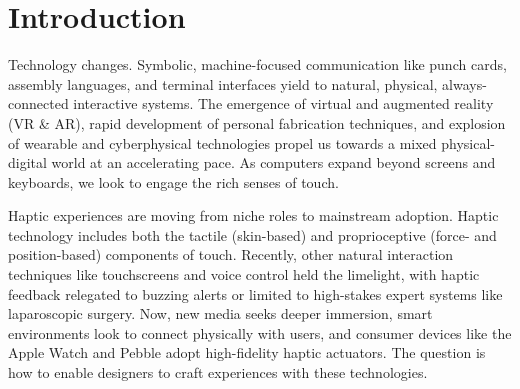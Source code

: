 
\chapter{Introduction}
\label{ch:introduction}
Technology changes.
Symbolic, machine-focused communication like punch cards, assembly languages, and terminal interfaces yield to natural, physical, always-connected interactive systems.
The emergence of virtual and augmented reality (VR \& AR), rapid development of personal fabrication techniques, and explosion of wearable and cyberphysical technologies propel us towards a mixed physical-digital world at an accelerating pace.
As computers expand beyond screens and keyboards, we look to engage the rich senses of touch.




Haptic experiences are moving from niche roles to mainstream adoption.
Haptic technology includes both the tactile (skin-based) and proprioceptive (force- and position-based) components of touch.
Recently, other natural interaction techniques like touchscreens and voice control held the limelight, with haptic feedback relegated to buzzing alerts or limited to high-stakes expert systems like laparoscopic surgery.
Now, new media seeks deeper immersion, smart environments look to connect physically with users, and consumer devices like the Apple Watch and Pebble adopt high-fidelity haptic actuators.
The question is how to enable designers to craft experiences with these technologies.

